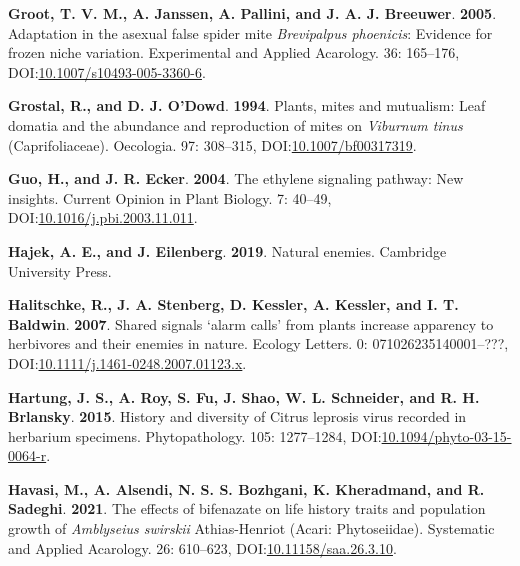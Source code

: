 \documentclass[12pt,final,CPage]{ufthesis}
\newlength{\cslhangindent}
\newenvironment{CSLReferences}[2] %
{%
	\setlength{\parindent}{0pt}
	\ifodd #1 \everypar{\setlength{\hangindent}{\cslhangindent}}\ignorespaces\fi
	\ifnum #2 > 0
	\setlength{\parskip}{#2\baselineskip}
	\fi
}%
{}
\begin{document}
{\begin{CSLReferences}{1}{0}
  \leavevmode{}%
  \textbf{Groot, T. V. M., A. Janssen, A. Pallini, and J. A. J. Breeuwer}. \textbf{2005}. Adaptation in the asexual false spider mite {\emph{Brevipalpus phoenicis}}: Evidence for frozen niche variation. Experimental and Applied Acarology. 36: 165--176, DOI:\href{https://doi.org/10.1007/s10493-005-3360-6}{10.1007/s10493-005-3360-6}.

  \leavevmode{}%
  \textbf{Grostal, R., and D. J. O'Dowd}. \textbf{1994}. Plants, mites and mutualism: Leaf domatia and the abundance and reproduction of mites on {\emph{Viburnum tinus}} ({Caprifoliaceae}). Oecologia. 97: 308--315, DOI:\href{https://doi.org/10.1007/bf00317319}{10.1007/bf00317319}.

  \leavevmode{}%
  \textbf{Guo, H., and J. R. Ecker}. \textbf{2004}. The ethylene signaling pathway: New insights. Current Opinion in Plant Biology. 7: 40--49, DOI:\href{https://doi.org/10.1016/j.pbi.2003.11.011}{10.1016/j.pbi.2003.11.011}.

  \leavevmode{}%
  \textbf{Hajek, A. E., and J. Eilenberg}. \textbf{2019}. Natural enemies. Cambridge University Press.

  \leavevmode{}%
  \textbf{Halitschke, R., J. A. Stenberg, D. Kessler, A. Kessler, and I. T. Baldwin}. \textbf{2007}. Shared signals {\textendash}{`alarm calls'} from plants increase apparency to herbivores and their enemies in nature. Ecology Letters. 0: 071026235140001--???, DOI:\href{https://doi.org/10.1111/j.1461-0248.2007.01123.x}{10.1111/j.1461-0248.2007.01123.x}.

  \leavevmode{}%
  \textbf{Hartung, J. S., A. Roy, S. Fu, J. Shao, W. L. Schneider, and R. H. Brlansky}. \textbf{2015}. History and diversity of {Citrus leprosis virus} recorded in herbarium specimens. Phytopathology{\textregistered}. 105: 1277--1284, DOI:\href{https://doi.org/10.1094/phyto-03-15-0064-r}{10.1094/phyto-03-15-0064-r}.

  \leavevmode{}%
  \textbf{Havasi, M., A. Alsendi, N. S. S. Bozhgani, K. Kheradmand, and R. Sadeghi}. \textbf{2021}. The effects of bifenazate on life history traits and population growth of {\emph{Amblyseius swirskii}} {Athias-Henriot} ({Acari}: {Phytoseiidae}). Systematic and Applied Acarology. 26: 610--623, DOI:\href{https://doi.org/10.11158/saa.26.3.10}{10.11158/saa.26.3.10}.


\end{CSLReferences}}
\end{document}
